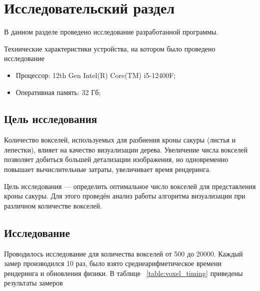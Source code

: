 \chapter{Исследовательский раздел}
В данном разделе проведено исследование разработанной программы.

Технические характеристики устройства, на котором было проведено исследование
\begin{itemize}
	\item Процессор: 12th Gen Intel(R) Core(TM) i5-12400F; 
	\item Оперативная память: 32 Гб;
\end{itemize}



\section{Цель исследования}

Количество вокселей, используемых для разбиения кроны сакуры (листья и лепестки), влияет на качество визуализации дерева. Увеличение числа вокселей позволяет добиться большей детализации изображения, но одновременно повышает вычислительные затраты, увеличивает время рендеринга.

Цель исследования — определить оптимальное число вокселей для представления кроны сакуры. Для этого проведён анализ работы алгоритма визуализации при различном количестве вокселей.

\section{Исследование}

Проводилось исследование для количества вокселей от 500 до 20000. Каждый замер производился 10 раз, было взято среднеарифметическое времени рендеринга и обновления физики.
В таблице ~\ref{table:voxel_timing} приведены результаты замеров

